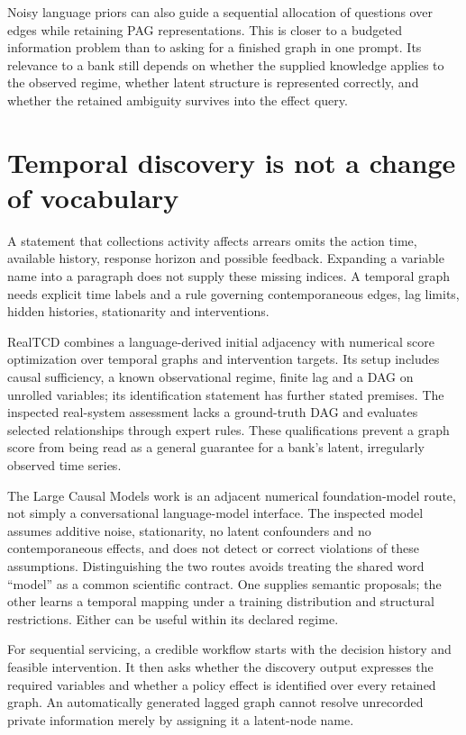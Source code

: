 Noisy language priors can also guide a sequential allocation of questions over
edges while retaining PAG representations.\cite{v12_la_2506_16234} This is closer
to a budgeted information problem than to asking for a finished graph in one
prompt. Its relevance to a bank still depends on whether the supplied knowledge
applies to the observed regime, whether latent structure is represented
correctly, and whether the retained ambiguity survives into the effect query.

\section{Temporal discovery is not a change of vocabulary}

A statement that collections activity affects arrears omits the action time,
available history, response horizon and possible feedback. Expanding a variable
name into a paragraph does not supply these missing indices. A temporal graph
needs explicit time labels and a rule governing contemporaneous edges, lag
limits, hidden histories, stationarity and interventions.

RealTCD combines a language-derived initial adjacency with numerical score
optimization over temporal graphs and intervention targets. Its setup includes
causal sufficiency, a known observational regime, finite lag and a DAG on
unrolled variables; its identification statement has further stated premises.
The inspected real-system assessment lacks a ground-truth DAG and evaluates
selected relationships through expert rules.\cite{v12_la_2404_14786} These
qualifications prevent a graph score from being read as a general guarantee
for a bank's latent, irregularly observed time series.

The Large Causal Models work is an adjacent numerical foundation-model route,
not simply a conversational language-model interface. The inspected model
assumes additive noise, stationarity, no latent confounders and no
contemporaneous effects, and does not detect or correct violations of these
assumptions.\cite{v12_la_2602_18662} Distinguishing the two routes avoids treating
the shared word ``model'' as a common scientific contract. One supplies semantic
proposals; the other learns a temporal mapping under a training distribution
and structural restrictions. Either can be useful within its declared regime.

For sequential servicing, a credible workflow starts with the decision history
and feasible intervention. It then asks whether the discovery output expresses
the required variables and whether a policy effect is identified over every
retained graph. An automatically generated lagged graph cannot resolve
unrecorded private information merely by assigning it a latent-node name.

